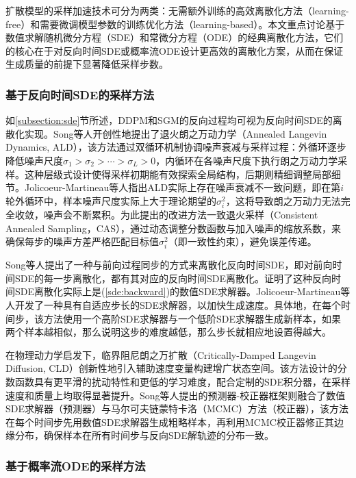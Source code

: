 \documentclass[11pt,a4paper,UTF8]{ctexart}
\begin{document}
扩散模型的采样加速技术可分为两类：无需额外训练的高效离散化方法（learning-free）和需要微调模型参数的训练优化方法（learning-based）。本文重点讨论基于数值求解随机微分方程（SDE）和常微分方程（ODE）的经典离散化方法，它们的核心在于对反向时间SDE或概率流ODE设计更高效的离散化方案，从而在保证生成质量的前提下显著降低采样步数。

\subsubsection{基于反向时间SDE的采样方法}

如\ref{subsection:sde}节所述，DDPM和SGM的反向过程均可视为反向时间SDE的离散化实现。Song等人\cite{song2019generative}开创性地提出了退火朗之万动力学（Annealed Langevin Dynamics, ALD），该方法通过双循环机制协调噪声衰减与采样过程：外循环逐步降低噪声尺度$\sigma_1>\sigma_2>\cdots>\sigma_L>0$，内循环在各噪声尺度下执行朗之万动力学采样。这种层级式设计使得采样初期能有效探索全局结构，后期则精细调整局部细节。Jolicoeur-Martineau等人\cite{JolicoeurMartineau2021AdversarialSM}指出ALD实际上存在噪声衰减不一致问题，即在第$i$轮外循环中，样本噪声尺度实际上大于理论期望的$\sigma_i^2$，这将导致朗之万动力无法完全收敛，噪声会不断累积。为此提出的改进方法一致退火采样（Consistent Annealed Sampling，CAS），通过动态调整分数函数与加入噪声的缩放系数，来确保每步的噪声方差严格匹配目标值$\sigma_i^2$（即一致性约束），避免误差传递。

Song等人\cite{song2020score}提出了一种与前向过程同步的方式来离散化反向时间SDE，即对前向时间SDE的每一步离散化，都有其对应的反向时间SDE离散化。\cite{song2020score}证明了这种反向时间SDE离散化实际上是(\ref{sde:backward})的数值SDE求解器。Jolicoeur-Martineau等人\cite{jolicoeur2021gotta}开发了一种具有自适应步长的SDE求解器，以加快生成速度。具体地，在每个时间步，该方法使用一个高阶SDE求解器与一个低阶SDE求解器生成新样本，如果两个样本越相似，那么说明这步的难度越低，那么步长就相应地设置得越大。

在物理动力学启发下，临界阻尼朗之万扩散（Critically-Damped Langevin Diffusion, CLD）\cite{dockhorn2021score}创新性地引入辅助速度变量构建增广状态空间。该方法设计的分数函数具有更平滑的扰动特性和更低的学习难度，配合定制的SDE积分器，在采样速度和质量上均取得显著提升。Song等人\cite{song2020score}提出的预测器-校正器框架则融合了数值SDE求解器（预测器）与马尔可夫链蒙特卡洛（MCMC）方法（校正器），该方法在每个时间步先用数值SDE求解器生成粗略样本，再利用MCMC校正器修正其边缘分布，确保样本在所有时间步与反向SDE解轨迹的分布一致。

\subsubsection{基于概率流ODE的采样方法}
\end{document}
